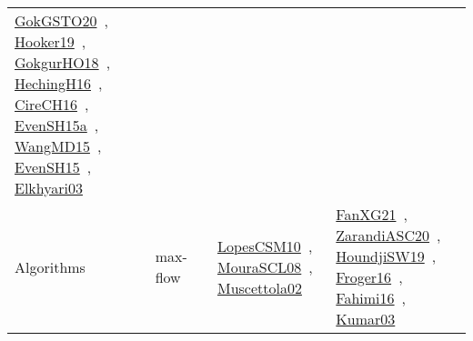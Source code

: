 {\begin{longtable}{lp{3cm}>{\raggedright\arraybackslash}p{6cm}>{\raggedright\arraybackslash}p{6cm}>{\raggedright\arraybackslash}p{8cm}}
\href{../works/GokGSTO20.pdf}{GokGSTO20}~\cite{GokGSTO20}, \href{../works/Hooker19.pdf}{Hooker19}~\cite{Hooker19}, \href{../works/GokgurHO18.pdf}{GokgurHO18}~\cite{GokgurHO18}, \href{../works/HechingH16.pdf}{HechingH16}~\cite{HechingH16}, \href{../works/CireCH16.pdf}{CireCH16}~\cite{CireCH16}, \href{../works/EvenSH15a.pdf}{EvenSH15a}~\cite{EvenSH15a}, \href{../works/WangMD15.pdf}{WangMD15}~\cite{WangMD15}, \href{../works/EvenSH15.pdf}{EvenSH15}~\cite{EvenSH15}, \href{../works/Elkhyari03.pdf}{Elkhyari03}~\cite{Elkhyari03}\\
Algorithms & max-flow &  & \href{../works/LopesCSM10.pdf}{LopesCSM10}~\cite{LopesCSM10}, \href{../works/MouraSCL08.pdf}{MouraSCL08}~\cite{MouraSCL08}, \href{../works/Muscettola02.pdf}{Muscettola02}~\cite{Muscettola02} & \href{../works/FanXG21.pdf}{FanXG21}~\cite{FanXG21}, \href{../works/ZarandiASC20.pdf}{ZarandiASC20}~\cite{ZarandiASC20}, \href{../works/HoundjiSW19.pdf}{HoundjiSW19}~\cite{HoundjiSW19}, \href{../works/Froger16.pdf}{Froger16}~\cite{Froger16}, \href{../works/Fahimi16.pdf}{Fahimi16}~\cite{Fahimi16}, \href{../works/Kumar03.pdf}{Kumar03}~\cite{Kumar03}\\

\end{longtable}}
